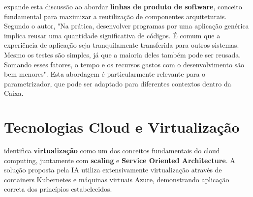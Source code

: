 \begin{comment}
	🧵 3. SAGA (Coordenação de Transações Distribuídas)
	📘 Conceito:
	Saga é um padrão para coordenar transações distribuídas entre múltiplos serviços, garantindo consistência eventual. Em vez de um COMMIT global, cada etapa tem sua ação e, se necessário, uma ação compensatória.
	
	🔄 Dois estilos principais:
	Orquestrada: Um orquestrador central envia comandos para os serviços (ex: Service A chama B, depois C).
	
	Coreografada: Cada serviço reage a eventos e publica outros, sem um controlador central.
	
	📌 Exemplo prático:
	Serviço A: cria o parâmetro.
	
	Serviço B: replica o parâmetro para Redis.
	
	Serviço C: envia notificação ao canal digital.
	
	Se C falha, o sistema aciona um evento de compensação que remove o parâmetro criado.
	
	⚙️ Interação entre eles
	Esses padrões costumam ser usados juntos:
	
	Event Sourcing registra tudo.
	
	CQRS separa leitura e escrita com base nos eventos.
	
	Sagas garantem consistência entre serviços distribuídos.
\end{comment}

 expande esta discussão ao abordar \textbf{linhas de produto de software}, conceito fundamental para maximizar a reutilização de componentes arquiteturais. Segundo o autor, "Na prática, desenvolver programas por uma aplicação genérica implica reusar uma quantidade significativa de códigos. É comum que a experiência de aplicação seja tranquilamente transferida para outros sistemas. Mesmo os testes são simples, já que a maioria deles também pode ser reusada. Somando esses fatores, o tempo e os recursos gastos com o desenvolvimento são bem menores". Esta abordagem é particularmente relevante para o parametrizador, que pode ser adaptado para diferentes contextos dentro da Caixa.

\section{Tecnologias Cloud e Virtualização}

 identifica \textbf{virtualização} como um dos conceitos fundamentais do cloud computing, juntamente com \textbf{scaling} e \textbf{Service Oriented Architecture}. A solução proposta pela IA utiliza extensivamente virtualização através de containers Kubernetes e máquinas virtuais Azure, demonstrando aplicação correta dos princípios estabelecidos.

